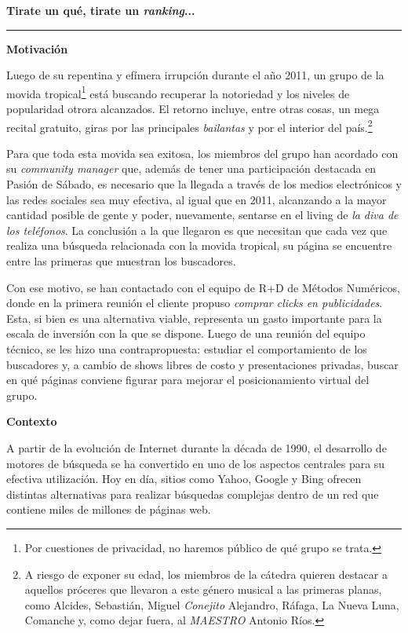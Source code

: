 \begin{center}
\textbf{\Large Tirate un qu\'e, tirate un \emph{ranking}...}
\end{center}

\vskip 10pt
\hrule
\vskip 5pt

\noindent\textbf{Motivaci\'on}
\vskip 5pt

Luego de su repentina y ef\'imera irrupci\'on durante el a\~no 2011, un grupo de la movida tropical\footnote{Por
cuestiones de privacidad, no haremos p\'ublico de qu\'e grupo se trata.} est\'a buscando recuperar la notoriedad y los niveles 
de popularidad otrora alcanzados. El retorno incluye, entre otras cosas, un mega recital gratuito, giras por las
principales \emph{bailantas} y por el interior del pa\'is.\footnote{A riesgo de exponer su edad, los miembros de la c\'atedra 
quieren destacar a aquellos pr\'oceres que llevaron a este g\'enero musical a las primeras planas, como Alcides, Sebasti\'an, 
Miguel \emph{Conejito} Alejandro, R\'afaga, La Nueva Luna, Comanche y, como dejar fuera, al \emph{MAESTRO} Antonio R\'ios.}

Para que toda esta movida sea exitosa, los miembros del grupo han acordado con su \emph{community manager} que, adem\'as de
tener una participaci\'on destacada en Pasi\'on de S\'abado, es necesario que la llegada a trav\'es de los medios electr\'onicos
y las redes sociales sea muy efectiva, al igual que en 2011, alcanzando a la mayor cantidad posible de gente y poder, nuevamente, 
sentarse en el living de \emph{la diva de los tel\'efonos}. La conclusi\'on a la que llegaron es que necesitan que cada vez que 
realiza una b\'usqueda relacionada con la movida tropical, su p\'agina se encuentre entre las primeras que muestran los buscadores.

Con ese motivo, se han contactado con el equipo de R+D de M\'etodos Num\'ericos, donde en la primera reuni\'on el cliente propuso
\emph{comprar clicks en publicidades}. Esta, si bien es una alternativa viable, representa un gasto importante para la escala de
inversi\'on con la que se dispone. Luego de una reuni\'on del equipo t\'ecnico, se les hizo una contrapropuesta:
estudiar el comportamiento de los buscadores y, a cambio de shows libres de costo y presentaciones privadas, buscar en qu\'e
p\'aginas conviene figurar para mejorar el posicionamiento virtual del grupo.
 
\vskip 5pt
\noindent\textbf{Contexto}
\vskip 5pt

A partir de la evoluci\'on de Internet durante la d\'ecada de 1990, el desarrollo de motores de b\'usqueda se ha convertido
en uno de los aspectos centrales para su efectiva utilizaci\'on. Hoy en d\'ia, sitios como Yahoo, Google y Bing ofrecen
distintas alternativas para realizar b\'usquedas complejas dentro de un red que contiene miles de millones de p\'aginas
web. 

